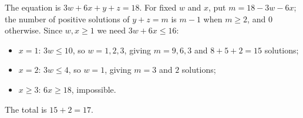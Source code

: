 The equation is $3w+6x+y+z=18$. For fixed $w$ and $x$, put $m=18-3w-6x$; the number of positive solutions of $y+z=m$ is $m-1$ when $m\ge2$, and $0$ otherwise. Since $w,x\ge1$ we need $3w+6x\le16$:
\begin{itemize}
\item $x=1$: $3w\le10$, so $w=1,2,3$, giving $m=9,6,3$ and $8+5+2=15$ solutions;
\item $x=2$: $3w\le4$, so $w=1$, giving $m=3$ and $2$ solutions;
\item $x\ge3$: $6x\ge18$, impossible.
\end{itemize}
The total is $15+2=\boxed{17}$.
